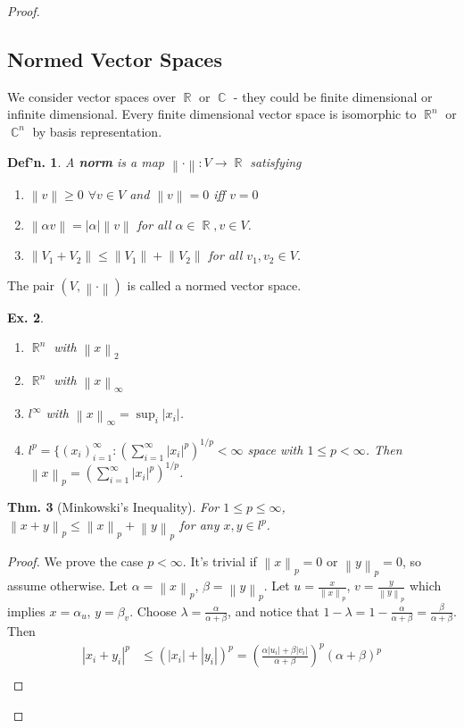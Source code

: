 \documentclass[12pt, a4paper]{book}
\DeclareMathOperator{\R}{\mathbb{R}}
\DeclareMathOperator{\C}{\mathbb{C}}
\newcommand{\norm}[1]{\left\lVert#1\right\rVert} %
\newtheorem{theorem}{Thm.}[section]
\newtheorem{definition}[theorem]{Def'n.}
\newtheorem{example}[theorem]{Ex.}
\theoremstyle{nonumberplain}
\newtheorem{proof}{Proof}
\begin{document}
\begin{proof}
\subsection{Normed Vector Spaces}
We consider vector spaces over $\R$ or $\C$ - they could be finite dimensional or infinite dimensional. Every finite dimensional
vector space is isomorphic to $\R^n$ or $\C^n$ by basis representation.
\begin{definition}
    A \textbf{norm} is a map $\norm{\cdot}:V\to\R$ satisfying
    \begin{enumerate}
        \item $\norm{v}\geq 0$ $\forall v\in V$ and $\norm{v}=0$ iff $v=0$
        \item $\norm{\alpha v}=|\alpha|\norm{v}$ for all $\alpha\in\R, v\in V$.
        \item $\norm{V_1+V_2}\leq\norm{V_1}+\norm{V_2}$ for all $v_1,v_2\in V$.
    \end{enumerate}
\end{definition}
The pair $(V,\norm{\cdot})$ is called a normed vector space.
\begin{example}
    \begin{enumerate}
        \item $\R^n$ with $\norm{x}_2$
        \item $\R^n$ with $\norm{x}_\infty$
        \item $l^\infty$ with $\norm{x}_\infty=\sup_i|x_i|$.
        \item $l^p=\{(x_i)_{i=1}^\infty:\left( \sum\limits_{i=1}^\infty |x_i|^p \right)^{1/p}<\infty$ space with $1\leq p<\infty$.
            Then $\norm{x}_p=\left(\sum\limits_{i=1}^\infty |x_i|^p\right)^{1/p}$.
    \end{enumerate}
\end{example}
\begin{theorem}[Minkowski's Inequality]
    For $1\leq p\leq\infty$, $\norm{x+y}_p\leq\norm{x}_p+\norm{y}_p$ for any $x,y\in l^p$.
\end{theorem}
\begin{proof}
    We prove the case $p<\infty$. It's trivial if $\norm{x}_p=0$ or $\norm{y}_p=0$, so assume otherwise. Let $\alpha=\norm{x}_p$,
    $\beta=\norm{y}_p$. Let $u=\frac{x}{\norm{x}_p}$, $v=\frac{y}{\norm{y}_p}$ which implies $x=\alpha_u$, $y=\beta_v$.
    Choose $\lambda=\frac{\alpha}{\alpha+\beta}$, and notice that $1-\lambda=1-\frac{\alpha}{\alpha+\beta}=\frac{\beta}{\alpha+\beta}$.
    Then
    \begin{align*}
        |x_i+y_i|^p &\leq \left( |x_i|+|y_i| \right)^p = \left( \frac{\alpha|u_i|+\beta|v_i|}{\alpha+\beta} \right)^p(\alpha+\beta)^p\\

\end{align*}
\end{proof}
\end{proof}
\end{document}

